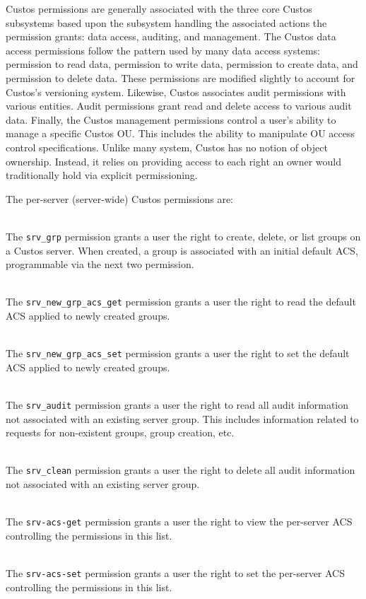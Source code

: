Custos permissions are generally associated with the three core Custos
subsystems based upon the subsystem handling the associated actions
the permission grants: data access, auditing, and management. The
Custos data access permissions follow the pattern used by many data
access systems: permission to read data, permission to write data,
permission to create data, and permission to delete data. These
permissions are modified slightly to account for Custos's versioning
system. Likewise, Custos associates audit permissions with various
entities. Audit permissions grant read and delete access to various
audit data.  Finally, the Custos management permissions control a
user's ability to manage a specific Custos OU. This includes the
ability to manipulate OU access control specifications. Unlike many
system, Custos has no notion of object ownership. Instead, it relies
on providing access to each right an owner would traditionally hold
via explicit permissioning.

\noindent
The per-server (server-wide) Custos permissions are:

\begin{packed_desc}
\item[\texttt{srv\_grp}] \hfill \\ The \texttt{srv\_grp} permission
  grants a user the right to create, delete, or list groups on a
  Custos server. When created, a group is associated with an initial
  default ACS, programmable via the next two permission.
\item[\texttt{srv\_new\_grp\_acs\_get}] \hfill \\ The
  \texttt{srv\_new\_grp\_acs\_get} permission grants a user the right
    to read the default ACS applied to newly created groups.
\item[\texttt{srv\_new\_grp\_acs\_set}] \hfill \\ The
  \texttt{srv\_new\_grp\_acs\_set} permission grants a user the right
  to set the default ACS applied to newly created groups.
\item[\texttt{srv\_audit}] \hfill \\ The \texttt{srv\_audit}
  permission grants a user the right to read all audit information not
  associated with an existing server group. This includes information
  related to requests for non-existent groups, group creation, etc.
\item[\texttt{srv\_clean}] \hfill \\ The \texttt{srv\_clean}
  permission grants a user the right to delete all audit information
  not associated with an existing server group.
\item[\texttt{srv-acs-get}] \hfill \\ The \texttt{srv-acs-get}
  permission grants a user the right to view the per-server ACS
  controlling the permissions in this list.
\item[\texttt{srv-acs-set}] \hfill \\ The \texttt{srv-acs-set}
  permission grants a user the right to set the per-server ACS
  controlling the permissions in this list.
\end{packed_desc}

